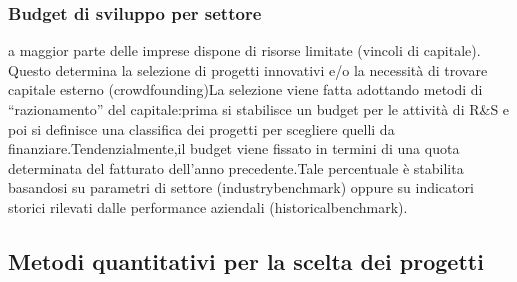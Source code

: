 \documentclass{article}
\begin{document}
\subsubsection{Budget di sviluppo per settore }
a maggior parte delle imprese dispone di risorse limitate (vincoli di capitale). Questo determina la selezione di progetti innovativi e/o la necessità di trovare capitale esterno (crowdfounding)La selezione viene fatta adottando metodi di “razionamento” del capitale:prima si stabilisce un budget per le attività di R\&S e poi si definisce una classifica dei progetti per scegliere quelli da finanziare.Tendenzialmente,il budget viene fissato in termini di una quota determinata del fatturato dell’anno precedente.Tale percentuale è stabilita basandosi su parametri di settore (industrybenchmark) oppure su indicatori storici rilevati dalle performance aziendali (historicalbenchmark).

\subsection{Metodi quantitativi per la scelta dei progetti}
\end{document}
